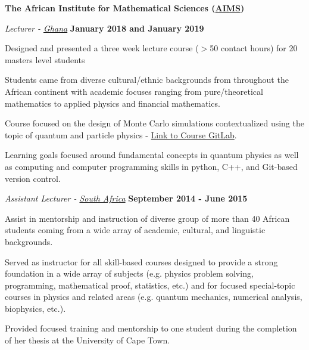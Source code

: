\documentclass[10pt]{article}
\newenvironment{outerlist}[1][\enskip\textbullet]%
        {\begin{itemize}[#1]}{\end{itemize}%
         \vspace{-.6\baselineskip}}
\newenvironment{innerlist}[1][\enskip\textbullet]%
        {\begin{compactitem}[#1]}{\end{compactitem}}
\begin{document}
\vspace{3mm}

\textbf{The African Institute for Mathematical Sciences (\href{https://www.nexteinstein.org/}{AIMS})}
\begin{outerlist}
\item[] \textit{Lecturer - \href{http://www.aims.edu.gh/}{Ghana}}%
    \hfill \textbf{January 2018 and January 2019}
    \begin{innerlist}
        \item Designed and presented a three week lecture course ($>$50 contact hours) for 20 masters level students
        \item Students came from diverse cultural/ethnic backgrounds from throughout the African continent with academic focuses ranging from pure/theoretical mathematics to applied physics and financial mathematics.
        \item Course focused on the design of Monte Carlo simulations contextualized using the topic of quantum and particle physics - \href{https://github.com/smeehan12/LifeOfAParticle}{Link to Course GitLab}.
        \item Learning goals focused around fundamental concepts in quantum physics as well as computing and computer programming skills in python, C++, and Git-based version control.
    \end{innerlist}
\item[] \textit{Assistant Lecturer - \href{http://www.aims.ac.za/en/opportunities/tutors}{South Africa}}%
    \hfill \textbf{September 2014 - June 2015}
    \begin{innerlist}
        \item Assist in mentorship and instruction of diverse group of more than 40 African students coming from a wide array of academic, cultural, and linguistic backgrounds.
        \item Served as instructor for all skill-based courses designed to provide a strong foundation in a wide array of subjects (e.g. physics problem solving, programming, mathematical proof, statistics, etc.) and for focused special-topic courses in physics and related areas (e.g. quantum mechanics, numerical analysis, biophysics, etc.).
        \item Provided focused training and mentorship to one student during the completion of her thesis at the University of Cape Town.
    \end{innerlist}
\end{outerlist}
\end{document}
